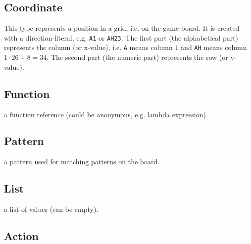 
\subsection{Coordinate}
This type represents a position in a grid, i.e. on the game board. It is created with
a direction-literal, e.g. \texttt{A1} or \texttt{AH23}. The first part (the alphabetical part)
represents the column (or x-value), i.e. \texttt{A} means column $1$ and \texttt{AH} means
column $1 \cdot 26 + 8 = 34$. The second part (the numeric part) represents the row (or y-value).


\subsection{Function}
a function reference (could be anonymous, e.g. lambda expression).
\subsection{Pattern}
a pattern used for matching patterns on the board.
\subsection{List}
a list of values (can be empty).
\subsection{Action}


